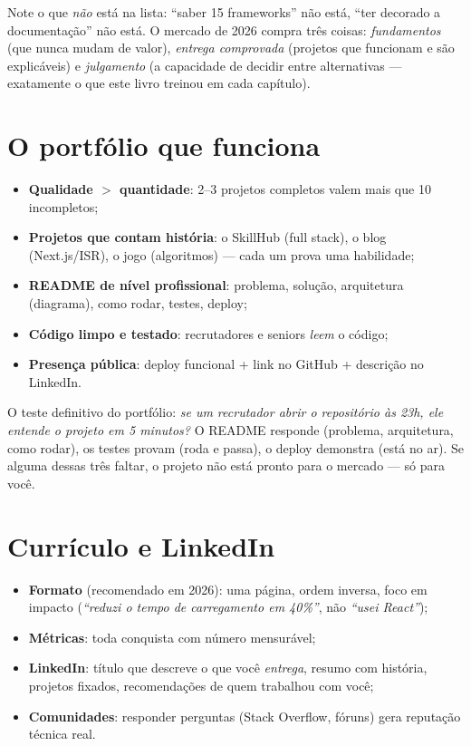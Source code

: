 \begin{caixaconceito}
Note o que \emph{não} está na lista: ``saber 15 frameworks'' não está, ``ter
decorado a documentação'' não está. O mercado de 2026 compra três coisas:
\emph{fundamentos} (que nunca mudam de valor), \emph{entrega comprovada}
(projetos que funcionam e são explicáveis) e \emph{julgamento} (a capacidade
de decidir entre alternativas — exatamente o que este livro treinou em cada
capítulo).
\end{caixaconceito}

\section{O portfólio que funciona}

\begin{itemize}[leftmargin=*, itemsep=0.4em]
  \item \textbf{Qualidade $>$ quantidade}: 2--3 projetos completos valem mais que 10 incompletos;
  \item \textbf{Projetos que contam história}: o SkillHub (full stack), o blog (Next.js/ISR), o jogo (algoritmos) — cada um prova uma habilidade;
  \item \textbf{README de nível profissional}: problema, solução, arquitetura (diagrama), como rodar, testes, deploy;
  \item \textbf{Código limpo e testado}: recrutadores e seniors \emph{leem} o código;
  \item \textbf{Presença pública}: deploy funcional + link no GitHub + descrição no LinkedIn.
\end{itemize}

\begin{caixadica}
O teste definitivo do portfólio: \emph{se um recrutador abrir o repositório às
23h, ele entende o projeto em 5 minutos?} O README responde (problema,
arquitetura, como rodar), os testes provam (roda e passa), o deploy
demonstra (está no ar). Se alguma dessas três faltar, o projeto não está
pronto para o mercado — só para você.
\end{caixadica}

\section{Currículo e LinkedIn}

\begin{itemize}[leftmargin=*, itemsep=0.4em]
  \item \textbf{Formato} (recomendado em 2026): uma página, ordem inversa, foco em impacto (\emph{``reduzi o tempo de carregamento em 40\%''}, não \emph{``usei React''});
  \item \textbf{Métricas}: toda conquista com número mensurável;
  \item \textbf{LinkedIn}: título que descreve o que você \emph{entrega}, resumo com história, projetos fixados, recomendações de quem trabalhou com você;
  \item \textbf{Comunidades}: responder perguntas (Stack Overflow, fóruns) gera reputação técnica real.
\end{itemize}

